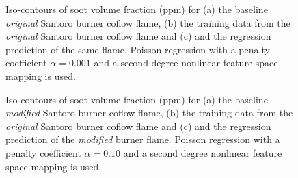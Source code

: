 \documentclass[12pt]{CHT-20}
\begin{document}
\begin{figure}[!ht]
\begin{center}
\end{center}
\caption{Iso-contours of soot volume fraction (ppm) for (a) the baseline \emph{original} Santoro burner coflow flame, (b) the training data from the \emph{original} Santoro burner coflow flame and (c) and the regression prediction of the same flame. Poisson regression with a penalty coefficient $\alpha=0.001$ and a second degree nonlinear feature space mapping is used.}
\label{fig:2D_contoursSantoro}
\end{figure}

\begin{figure}[!ht]
\begin{center}
\end{center}
\caption{Iso-contours of soot volume fraction (ppm) for (a) the baseline \emph{modified} Santoro burner coflow flame, (b) the training data from the \emph{original} Santoro burner coflow flame and (c) and the regression prediction of the \emph{modified} burner flame. Poisson regression with a penalty coefficient $\alpha=0.10$ and a second degree nonlinear feature space mapping is used.}
\label{fig:2D_contoursFM}
\end{figure}
\end{document}
